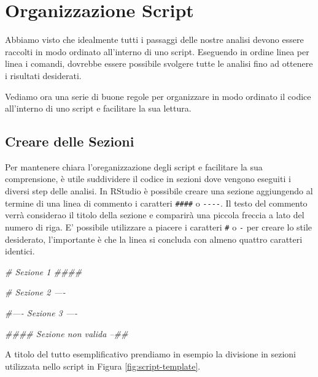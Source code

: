 \documentclass[
]{book}
\newenvironment{Shaded}{\begin{snugshade}}{\end{snugshade}}
\newcommand{\CommentTok}[1]{\textcolor[rgb]{0.56,0.35,0.01}{\textit{#1}}}
\begin{document}
\hypertarget{organizzazione-script}{%
\section{Organizzazione Script}\label{organizzazione-script}}

Abbiamo visto che idealmente tutti i passaggi delle nostre analisi devono essere raccolti in modo ordinato all'interno di uno script. Eseguendo in ordine linea per linea i comandi, dovrebbe essere possibile svolgere tutte le analisi fino ad ottenere i risultati desiderati.

Vediamo ora una serie di buone regole per organizzare in modo ordinato il codice all'interno di uno script e facilitare la sua lettura.

\hypertarget{creare-delle-sezioni}{%
\subsection{Creare delle Sezioni}\label{creare-delle-sezioni}}

Per mantenere chiara l'oreganizzazione degli script e facilitare la sua comprensione, è utile suddividere il codice in sezioni dove vengono eseguiti i diversi step delle analisi. In RStudio è possibile creare una sezione aggiungendo al termine di una linea di commento i caratteri \texttt{\#\#\#\#} o \texttt{-\/-\/-\/-}. Il testo del commento verrà considerao il titolo della sezione e comparirà una piccola freccia a lato del numero di riga. E' possibile utilizzare a piacere i caratteri \texttt{\#} o \texttt{-} per creare lo stile desiderato, l'importante è che la linea si concluda con almeno quattro caratteri identici.

\begin{Shaded}
\begin{Highlighting}[]
\CommentTok{# Sezione 1 ####}

\CommentTok{# Sezione 2 ----}

\CommentTok{#----    Sezione 3    ----}

\CommentTok{####   Sezione non valida   --##}
\end{Highlighting}
\end{Shaded}

A titolo del tutto esemplificativo prendiamo in esempio la divisione in sezioni utilizzata nello script in Figura \ref{fig:script-template}.
\end{document}
